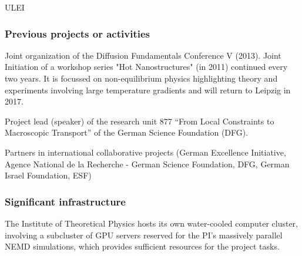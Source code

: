 \begin{sitedescription}{ULEI}
\begin{compactenum}





\end{compactenum}

\subsubsection*{Previous projects or activities}

\begin{compactenum}
%
\item Joint organization of the Diffusion Fundamentals Conference V (2013). 
Joint Initiation of a workshop series "Hot Nanostructures"
(in 2011) continued every two years. It is focussed on non-equilibrium physics highlighting theory and experiments 
involving large temperature gradients and will return to Leipzig in 2017. 

\item Project lead (speaker) of the research unit 877 ``From Local Constraints to Macroscopic Transport'' of the German 
Science Foundation (DFG).

\item Partners in international collaborative projects (German Excellence Initiative, Agence National de la Recherche - 
German Science Foundation, DFG, German Israel Foundation, ESF)
\end{compactenum}

\subsubsection*{Significant infrastructure}
The Institute of Theoretical Physics hosts its own water-cooled computer cluster, 
involving a subcluster of GPU servers reserved for the PI's massively parallel NEMD simulations, 
which provides sufficient resources for the project tasks.
\end{sitedescription}

